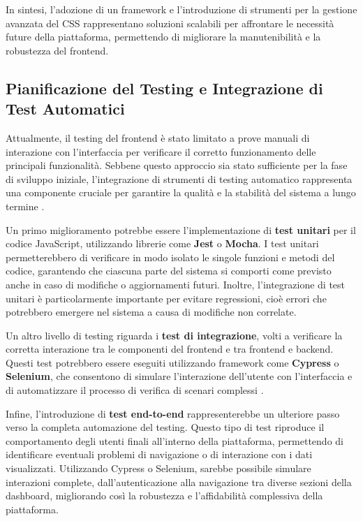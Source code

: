 In sintesi, l’adozione di un framework e l’introduzione di strumenti per la gestione avanzata del CSS rappresentano soluzioni scalabili per affrontare le necessità future della piattaforma, permettendo di migliorare la manutenibilità e la robustezza del frontend.

\subsection{Pianificazione del Testing e Integrazione di Test Automatici}
\label{sec:testing_frontend}

Attualmente, il testing del frontend è stato limitato a prove manuali di interazione con l’interfaccia per verificare il corretto funzionamento delle principali funzionalità. Sebbene questo approccio sia stato sufficiente per la fase di sviluppo iniziale, l’integrazione di strumenti di testing automatico rappresenta una componente cruciale per garantire la qualità e la stabilità del sistema a lungo termine \cite{monitoring2021}.

Un primo miglioramento potrebbe essere l’implementazione di \textbf{test unitari} per il codice JavaScript, utilizzando librerie come \textbf{Jest} o \textbf{Mocha}. I test unitari permetterebbero di verificare in modo isolato le singole funzioni e metodi del codice, garantendo che ciascuna parte del sistema si comporti come previsto anche in caso di modifiche o aggiornamenti futuri. Inoltre, l’integrazione di test unitari è particolarmente importante per evitare regressioni, cioè errori che potrebbero emergere nel sistema a causa di modifiche non correlate.

Un altro livello di testing riguarda i \textbf{test di integrazione}, volti a verificare la corretta interazione tra le componenti del frontend e tra frontend e backend. Questi test potrebbero essere eseguiti utilizzando framework come \textbf{Cypress} o \textbf{Selenium}, che consentono di simulare l’interazione dell’utente con l’interfaccia e di automatizzare il processo di verifica di scenari complessi \cite{monitoring2021}.

Infine, l’introduzione di \textbf{test end-to-end} rappresenterebbe un ulteriore passo verso la completa automazione del testing. Questo tipo di test riproduce il comportamento degli utenti finali all'interno della piattaforma, permettendo di identificare eventuali problemi di navigazione o di interazione con i dati visualizzati. Utilizzando Cypress o Selenium, sarebbe possibile simulare interazioni complete, dall’autenticazione alla navigazione tra diverse sezioni della dashboard, migliorando così la robustezza e l’affidabilità complessiva della piattaforma.

